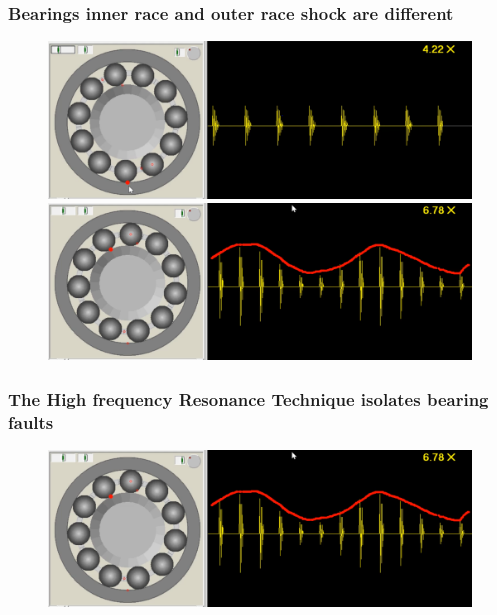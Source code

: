 \documentclass{beamer}
\begin{document}
\begin{frame}
	\frametitle{Bearings inner race and outer race shock are different}
	\begin{figure}[H]
		\centering
		\includegraphics[width=0.8\linewidth]{outer-race2}
		\includegraphics[width=0.8\linewidth]{inner-race2}
	\end{figure}
\end{frame}




\begin{frame}
	\frametitle{The High frequency Resonance Technique isolates bearing faults }
	\begin{figure}[H]
		\centering
		\includegraphics[width=1.\linewidth]{inner-race2}
	\end{figure}
\end{frame}
\end{document}
